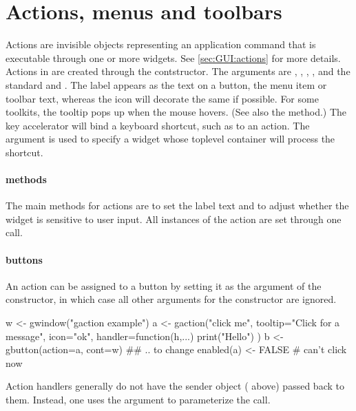 \section{Actions, menus and toolbars}
\label{sec:gWidgets-acti-menus-toolb}


Actions are invisible objects representing an application command that
is executable through one or more widgets. See \ref{sec:GUI:actions}
for more details. Actions in  are created through the
 contstructor. The arguments are
, ,
, ,
 and the standard
 and . The label
appears as the text on a button, the menu item or toolbar text,
whereas the icon will decorate the same if possible. For some
toolkits, the tooltip pops up when the mouse hovers.  (See also the
 method.) The key accelerator will bind a
keyboard shortcut, such as  to an action. The
 argument is used to specify a widget whose toplevel
container will process the shortcut.

\paragraph{methods}
The main methods for actions are  to
set the label text and  to adjust
whether the widget is sensitive to user input. All instances of the
action are set through one call.

\paragraph{buttons}
An action can be assigned to a button by setting it as the
 argument of the  constructor,
in which case all other arguments for the constructor are ignored.

\begin{Schunk}
\begin{Sinput}
 w <- gwindow("gaction example")
 a <- gaction("click me", tooltip="Click for a message", icon="ok", 
              handler=function(h,...) {
                print("Hello")
                })
 b <- gbutton(action=a, cont=w)
 ## .. to change
 enabled(a) <- FALSE                     # can't click now
\end{Sinput}
\end{Schunk}
Action handlers generally do not have the sender object ( above)
passed back to them. Instead, one uses
the  argument to parameterize the call.



